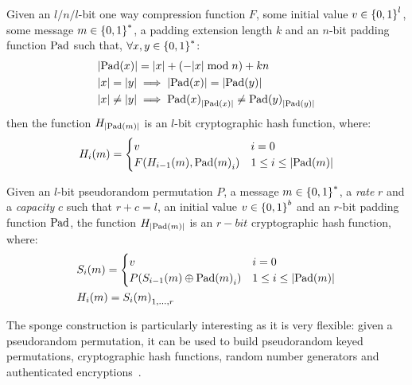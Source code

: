 \begin{proposition}
	Given an \(l/n/l\)-bit one way compression function \(F\), some initial value 
	\(v \in \left\{0, 1\right\}^{l}\), some message \(m \in \left\{0, 1\right\}^*\), a padding extension length \(k\) 
	and an \(n\)-bit padding function \(\mathrm{Pad} \) such that, 
	\(\forall x, y \in \left\{0, 1\right\}^{*}\):
	\begin{align*}
    & \abs{\call{\Pad}{x}} = \abs{x} + \Parens*{-\abs{x} \bmod n} + kn \\
		& \abs{x} = \abs{y} \implies \abs{\call{\Pad}{x}} = \abs{\call{\Pad}{y}} \\
    & \abs{x} \neq \abs{y} \implies 
			\call{\Pad}{x}_{\abs{\call{\Pad}{x}}} \neq \call{\Pad}{y}_{\abs{\call{\Pad}{y}}}
  \end{align*}
	then the function \(H_{\left\lvert\mathrm{Pad}\left(m\right)\right\rvert}\) is an \(l\)-bit cryptographic hash function, 
	where:
	\[
		\call{H_{i}}{m} =
		\begin{cases}
			v                                               & i = 0   \\
			\call{F}{\call{H_{i-1}}{m}, \call{\Pad}{m}_{i}} & 1 \le i \le \abs{\call{\Pad}{m}}
		\end{cases}
	\]
\end{proposition}

\begin{proposition}
	Given an \(l\)-bit pseudorandom permutation \(P\), a message \(m \in \left\{0, 1\right\}^{*}\), a 
	\emph{rate} \(r\) and a \emph{capacity} \(c\) such that \(r + c = l\), an initial value 
	\(v \in \left\{0, 1\right\}^b\) and an \(r\)-bit padding function \(\mathrm{Pad} \), the 
	function \(H_{\left\lvert\mathrm{Pad}\left(m\right)\right\rvert}\) is an \(r-bit\) cryptographic hash function, where:
	\begin{align*}
		& \call{S_{i}}{m} = 
		\begin{cases}
			v & i = 0 \\
			\call{P}{\call{S_{i-1}}{m} \oplus \call{\Pad}{m}_i} & 1 \le i \le \abs{\call{\Pad}{m}}
		\end{cases} \\
		& \call{H_{i}}{m} = \call{S_{i}}{m}_{1,\dots,r}
	\end{align*}
\end{proposition}

The sponge construction is particularly interesting as it is very flexible: given a pseudorandom 
permutation, it can be used to build pseudorandom keyed permutations, cryptographic hash functions, 
random number generators and authenticated encryptions~\cite{BertoniDPA2012}.
